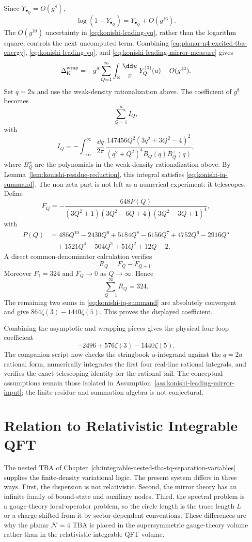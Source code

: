 Since \(Y_{\bullet_Q}=O(g^8)\),
\[
  \log(1+Y_{\bullet_Q})=Y_{\bullet_Q}+O(g^{16}).
\]
The \(O(g^{10})\) uncertainty in
\eqref{eq:konishi-leading-yq}, rather than the logarithm square, controls the
next uncomputed term.  Combining \eqref{eq:planar-n4-excited-tba-energy},
\eqref{eq:konishi-leading-yq}, and
\eqref{eq:konishi-leading-mirror-measure} gives
\[
  \Delta_{\rm K}^{\rm wrap}
  =
  -g^8\sum_{Q=1}^\infty
  \int_{\mathbb R}\frac{\dd u}{\pi}\,Y_Q^{(0)}(u)+O(g^{10}).
\]
Set \(q=2u\) and use
the weak-density rationalization above.  The coefficient
of \(g^8\) becomes
\[
  \sum_{Q=1}^\infty I_Q,
\]
with
\begin{equation}
  I_Q
  =
  -\int_{-\infty}^{\infty}\frac{\dd q}{2\pi}\,
  \frac{147456Q^2(3q^2+3Q^2-4)^2}
       {(q^2+Q^2)^4 B_Q^-(q)B_Q^+(q)},
  \label{eq:konishi-iq-integral}
\end{equation}
where \(B_Q^\pm\) are the polynomials in
the weak-density rationalization above.
By Lemma~\ref{lem:konishi-residue-reduction}, this integral satisfies
\eqref{eq:konishi-iq-summand}.
The non-zeta part is not left as a numerical experiment: it telescopes.  Define
\[
  F_Q
  =
  -\frac{648P(Q)}
  {(3Q^2+1)(3Q^2-6Q+4)(3Q^2-3Q+1)^4},
\]
with
\[
\begin{aligned}
  P(Q)
  &=
  486Q^{10}-2430Q^9+5184Q^8-6156Q^7+4752Q^6
  -2916Q^5
\\
  &\quad
  +1521Q^4-504Q^3+51Q^2+12Q-2 .
\end{aligned}
\]
A direct common-denominator calculation verifies
\[
  R_Q=F_Q-F_{Q+1}.
\]
Moreover \(F_1=324\) and \(F_Q\to0\) as \(Q\to\infty\).  Hence
\[
  \sum_{Q=1}^\infty R_Q=324.
\]
The remaining two sums in \eqref{eq:konishi-iq-summand} are absolutely
convergent and give \(864\zeta(3)-1440\zeta(5)\).  This proves the displayed
coefficient.

Combining the asymptotic and wrapping pieces gives the physical four-loop
coefficient
\[
  -2496+576\zeta(3)-1440\zeta(5).
\]
The companion script
 now checks the
stringbook \(u\)-integrand against the \(q=2u\) rational form, numerically
integrates the first four real-line rational integrals, and verifies the
exact telescoping identity for the rational tail.  The conceptual assumptions
remain those isolated in
Assumption~\ref{ass:konishi-leading-mirror-input}; the finite residue and
summation algebra is not conjectural.

\section{Relation to Relativistic Integrable QFT}

The nested TBA of
Chapter~\ref{ch:integrable-nested-tba-tq-separation-variables} supplies the
finite-density variational logic.  The present system differs in three ways.
First, the dispersion is not relativistic.  Second, the mirror theory has an
infinite family of bound-state and auxiliary nodes.  Third, the spectral
problem is a gauge-theory local-operator problem, so the circle length is the
trace length \(L\) or a charge shifted from it by sector-dependent
conventions.  These differences are why the planar \(\mathcal N=4\) TBA is
placed in the supersymmetric gauge-theory volume rather than in the
relativistic integrable-QFT volume.
